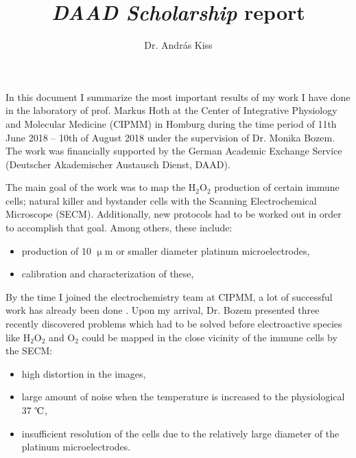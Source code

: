 \documentclass[a4paper, 11pt, oneside, bibliography=totoc]{article}
\begin{document}
\title{\emph{DAAD Scholarship} report}
\author{Dr. András Kiss}
\maketitle

In this document I summarize the most important results of my work I have done in the laboratory of prof. Markus Hoth at the Center of Integrative Physiology and Molecular Medicine (CIPMM) in Homburg during the time period of 11th June 2018 -- 10th of August 2018 under the supervision of Dr. Monika Bozem. The work was financially supported by the German Academic Exchange Service (Deutscher Akademischer Austausch Dienst, DAAD).

The main goal of the work was to map the H$_2$O$_2$ production of certain immune cells; natural killer and bystander cells with the Scanning Electrochemical Microscope (SECM). Additionally, new protocols had to be worked out in order to accomplish that goal. Among others, these include:

\begin{itemize}
\item production of 10 $\upmu$m or smaller diameter platinum microelectrodes,
\item calibration and characterization of these,
\end{itemize}

By the time I joined the electrochemistry team at CIPMM, a lot of successful work has already been done \cite{bozem2018electrochemical}. Upon my arrival, Dr. Bozem presented three recently discovered problems which had to be solved before electroactive species like H$_2$O$_2$ and O$_2$ could be mapped in the close vicinity of the immune cells by the SECM:
 
\begin{itemize}
\item high distortion in the images,
\item large amount of noise when the temperature is increased to the physiological 37 $\celsius$,
\item insufficient resolution of the cells due to the relatively large diameter of the platinum microelectrodes.
\end{itemize}
\end{document}

